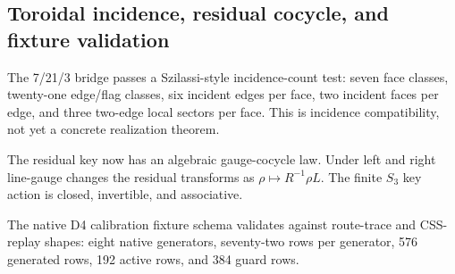 \subsection{Toroidal incidence, residual cocycle, and fixture validation}
\label{sec:bt1514-bt1516-toroid-cocycle-fixture}

The 7/21/3 bridge passes a Szilassi-style incidence-count test: seven face classes, twenty-one edge/flag classes, six incident edges per face, two incident faces per edge, and three two-edge local sectors per face.  This is incidence compatibility, not yet a concrete realization theorem.

The residual key now has an algebraic gauge-cocycle law.  Under left and right line-gauge changes the residual transforms as \(\rho\mapsto R^{-1}\rho L\).  The finite \(S_3\) key action is closed, invertible, and associative.

The native D4 calibration fixture schema validates against route-trace and CSS-replay shapes: eight native generators, seventy-two rows per generator, 576 generated rows, 192 active rows, and 384 guard rows.
